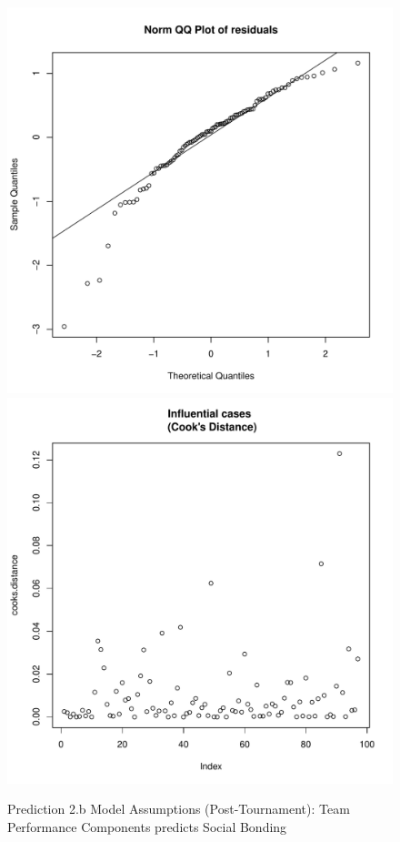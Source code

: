 \begin{CJK}{UTF8}{gbsn}
\begin{figure}[!htbp]
        \includegraphics[scale =.4]{images/MLM3bQQNorm.pdf}
        \includegraphics[scale =.4]{images/MLM3bCooksD.pdf}
        \caption{Prediction 2.b Model Assumptions (Post-Tournament): Team Performance Components predicts Social Bonding}
        \label{fig:MLM3bAssumptions}
     \end{figure}


\end{CJK}
